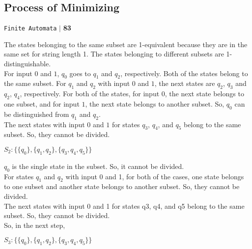 \documentclass[a4,9pt]{beamer}
\begin{document}
\begin{frame}
\section*{Process of Minimizing}
\begin{flushright}
 \texttt{Finite Automata} \hspace*{0.1cm}\textbf{$|$} \hspace*{0.1cm} \textbf{83}\hspace*{0.1cm}
\end{flushright}

\vspace*{1cm}
The states belonging to the same subset are 1-equivalent because they are in the same set for string
length 1. The states belonging to different subsets are 1-distinguishable.\\
\hspace*{0.1cm} For input $0$ and $1$, $q_0$ goes to $q_1$ and $q_2$, respectively. Both of the states belong to the same subset. For
$q_1$ and $q_2$ with input $0$ and $1$, the next states are $q_2$, $q_3$ and $q_2$, $q_4$, respectively. For both of the states, for
input $0$, the next state belongs to one subset, and for input $1$, the next state belongs to another subset. So,
$q_0$ can be distinguished from $q_1$ and $q_2$.\\
\hspace*{0.1cm}The next states with input $0$ and $1$ for states $q_3$, $q_4$, and $q_5$ belong to the same subset. So, they cannot
be divided.

\pause
\vspace*{1cm}
\begin{center}
$S_2: \{\{q_0\}, \{q_1, q_2\}, \{q_3, q_4, q_5\}\}$
\end{center}
\end{frame}

\begin{frame}
$q_0$ is the single state in the subset. So, it cannot be divided.\\
\hspace*{0.1cm} For states $q_1$ and $q_2$ with input 0 and 1, for both of the cases, one state belongs to one subset and
another state belongs to another subset. So, they cannot be divided.\\
\hspace*{0.1cm} The next states with input 0 and 1 for states q3, q4, and q5 belong to the same subset. So, they cannot
be divided.\\
\hspace*{0.1cm} So, in the next step,

\pause
\vspace*{1cm}
\begin{center}
$S_3: \{\{q_0\}, \{q_1, q_2\}, \{q_3, q_4, q_5\}\}$
\end{center}
\end{frame}
\end{document}
